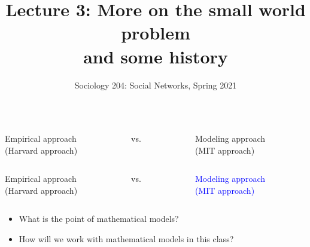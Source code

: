 \documentclass[aspectratio=169]{beamer}
\title[]{Lecture 3: More on the small world problem\\and some history}
\author[]{Sociology 204: Social Networks, Spring 2021}
\institute[]{Matthew J. Salganik}
\date[]{
2/3: Random graphs

\vfill

\begin{flushleft}
\vspace{0.7in}
\texttt{[image: figures/cc.png]}
\end{flushleft}
}
\begin{document}
\frame{\titlepage}
\begin{frame}

\begin{center}
\begin{columns}
\begin{column}{0.4\textwidth}
Empirical approach\\(Harvard approach)
\end{column}
\begin{column}{0.2\textwidth}
vs.
\end{column}
\begin{column}{0.4\textwidth}
Modeling approach\\(MIT approach)
\end{column}
\end{columns}
\end{center}

\end{frame}
\begin{frame}

\begin{center}
\begin{columns}
\begin{column}{0.4\textwidth}
Empirical approach\\(Harvard approach)
\end{column}
\begin{column}{0.2\textwidth}
vs.
\end{column}
\begin{column}{0.4\textwidth}
\textcolor{blue}{Modeling approach\\(MIT approach)}
\end{column}
\end{columns}
\end{center}

\end{frame}
\begin{frame}

\begin{itemize}
\item What is the point of mathematical models?
\pause
\item How will we work with mathematical models in this class?
\end{itemize}


\end{frame}
\end{document}
